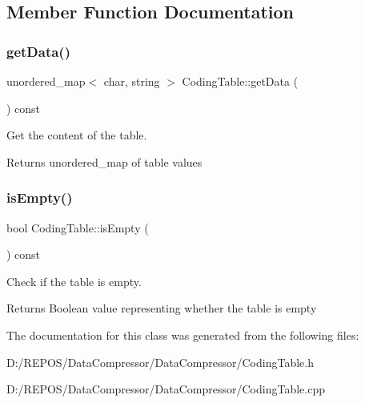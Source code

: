 

\subsection{Member Function Documentation}
\mbox{\label{class_coding_table_af896cb49760b28f88dcc3524f4972058}} 
\subsubsection{\texorpdfstring{getData()}{getData()}}
{\footnotesize\ttfamily unordered\+\_\+map$<$ char, string $>$ Coding\+Table\+::get\+Data (\begin{DoxyParamCaption}{ }\end{DoxyParamCaption}) const}



Get the content of the table. 

\begin{DoxyReturn}{Returns}
unordered\+\_\+map of table values 
\end{DoxyReturn}
\mbox{\label{class_coding_table_a48c523f7f362f31cef5da3385b1e1198}} 
\subsubsection{\texorpdfstring{isEmpty()}{isEmpty()}}
{\footnotesize\ttfamily bool Coding\+Table\+::is\+Empty (\begin{DoxyParamCaption}{ }\end{DoxyParamCaption}) const}



Check if the table is empty. 

\begin{DoxyReturn}{Returns}
Boolean value representing whether the table is empty 
\end{DoxyReturn}


The documentation for this class was generated from the following files\+:\begin{DoxyCompactItemize}
\item 
D\+:/\+R\+E\+P\+O\+S/\+Data\+Compressor/\+Data\+Compressor/Coding\+Table.\+h\item 
D\+:/\+R\+E\+P\+O\+S/\+Data\+Compressor/\+Data\+Compressor/Coding\+Table.\+cpp\end{DoxyCompactItemize}
